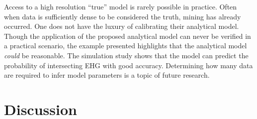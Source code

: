 

Access to a high resolution ``true'' model is rarely possible in practice. Often when data is sufficiently dense to be considered the truth, mining has already occurred. One does not have the luxury of calibrating their analytical model. Though the application of the proposed analytical model can never be verified in a practical scenario, the example presented highlights that the analytical model \emph{could} be reasonable. The simulation study shows that the model can predict the probability of intersecting EHG with good accuracy. Determining how many data are required to infer model parameters is a topic of future research.

\FloatBarrier
\section{Discussion}
\label{sec:02discuss}